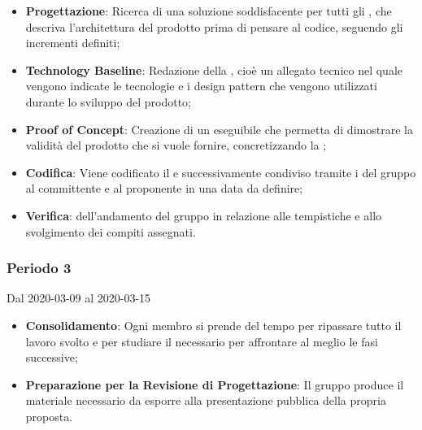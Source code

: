 \begin{itemize}
	\item \textbf{Progettazione}: Ricerca di una soluzione soddisfacente per tutti gli , che descriva l'architettura del prodotto prima di pensare al codice, seguendo gli incrementi definiti;
	\item \textbf{Technology Baseline}: Redazione della , cioè un allegato tecnico nel quale vengono indicate le tecnologie e i design pattern che vengono utilizzati durante lo sviluppo del prodotto;
	\item \textbf{Proof of Concept}: Creazione di un eseguibile che permetta di dimostrare la validità del prodotto che si vuole fornire, concretizzando la ;
	\item \textbf{Codifica}: Viene codificato il  e successivamente condiviso tramite i  del gruppo al committente e al proponente in una data da definire;
	\item \textbf{Verifica}:  dell'andamento del gruppo in relazione alle tempistiche e allo svolgimento dei compiti assegnati.
\end{itemize}

\subsubsection{Periodo 3} 
Dal 2020-03-09 al 2020-03-15
\begin{itemize}
	\item \textbf{Consolidamento}: Ogni membro si prende del tempo per ripassare tutto il lavoro svolto e per studiare il necessario per affrontare al meglio le fasi successive;
	\item \textbf{Preparazione per la Revisione di Progettazione}: Il gruppo produce il materiale necessario da esporre alla presentazione pubblica della propria proposta.
\end{itemize}


